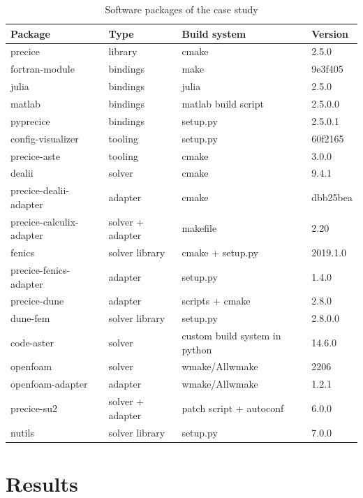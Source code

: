 \documentclass{eceasst}
\begin{document}
\begin{table}[!t]
  \normalsize
  \caption{Software packages of the case study}
  \label{table:label-distribution}
  \centering
  \begin{tabular}{|l|l|l|l|}
    \hline
    \bfseries Package & \bfseries Type & \bfseries Build system & \bfseries Version \\ \hline
    precice & library & cmake & 2.5.0 \\ \hline
    fortran-module & bindings & make & 9e3f405 \\ \hline
    julia & bindings & julia & 2.5.0 \\ \hline
    matlab & bindings & matlab build script & 2.5.0.0 \\ \hline
    pyprecice & bindings & setup.py & 2.5.0.1 \\ \hline
    config-visualizer & tooling & setup.py & 60f2165 \\ \hline
    precice-aste & tooling & cmake & 3.0.0 \\ \hline
    dealii & solver & cmake & 9.4.1 \\ \hline
    precice-dealii-adapter & adapter & cmake & dbb25bea \\ \hline
    precice-calculix-adapter & solver + adapter & makefile & 2.20 \\ \hline
    fenics & solver library& cmake + setup.py & 2019.1.0 \\ \hline
    precice-fenics-adapter & adapter & setup.py & 1.4.0 \\ \hline
    precice-dune & adapter & scripts + cmake & 2.8.0 \\ \hline
    dune-fem & solver library & setup.py & 2.8.0.0 \\ \hline
    code-aster & solver & custom build system in python & 14.6.0 \\ \hline
    openfoam & solver & wmake/Allwmake & 2206 \\ \hline
    openfoam-adapter & adapter & wmake/Allwmake & 1.2.1 \\ \hline
    precice-su2 & solver + adapter & patch script + autoconf & 6.0.0 \\ \hline
    nutils & solver library & setup.py & 7.0.0 \\ \hline
  \end{tabular}
\end{table}


\section{Results}
\end{document}

